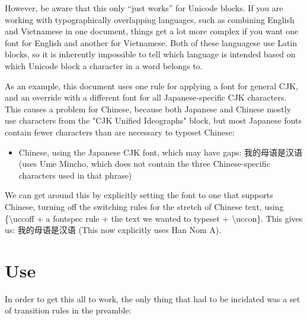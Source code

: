 ﻿\documentclass{article}
\newenvironment{itemlist}{%
  \begin{itemize}
	\setlength{\itemsep}{0pt}
	\setlength{\parsep}{0pt}
	\setlength{\topsep}{0pt}
	\setlength{\partopsep}{0pt}
	\setlength{\parskip}{0pt}
	\setlength{\labelsep}{5pt}}%
{
  \end{itemize}}
\begin{document}
		However, be aware that this only “just works” for Unicode blocks. If you are working with typographically overlapping languages, such as combining English and Vietnamese in one document, things get a lot more complex if you want one font for English and another for Vietnamese. Both of these languagese use Latin blocks, so it is inherently impossible to tell which language is intended based on which Unicode block a character in a word belongs to.

		As an example, this document uses one rule for applying a font for general CJK, and an override with a different font for all Japanese-specific CJK characters. This causes a problem for Chinese, because both Japanese and Chinese mostly use characters from the "CJK Unified Ideographs" block, but most Japanese fonts contain fewer characters than are necessary to typeset Chinese:

    \begin{itemlist}
			\item Chinese, using the Japanese CJK font, which may have gaps: 我的母语是汉语 (uses Ume Mincho, which does not contain the three Chinese-specific characters used in that phrase)
    \end{itemlist}

  We can get around this by explicitly setting the font to one that supports Chinese, turning off the switching rules for the stretch of Chinese text, using \{\textbackslash uccoff + a fontspec rule + the text we wanted to typeset + \textbackslash uccon\}. This gives us: {\uccoff {} 我的母语是汉语 \uccon} (This now explicitly uses Han Nom A).

	\section{Use}

		In order to get this all to work, the only thing that had to be incidated was a set of transition rules in the preamble:
\end{document}
